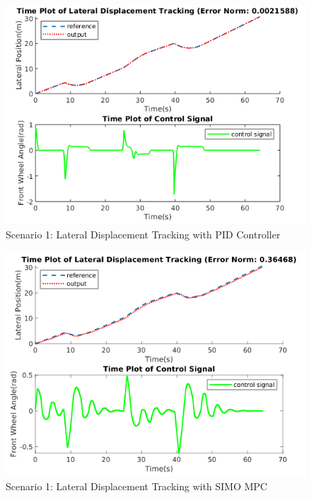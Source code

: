 \documentclass[a4paper, twocolumn]{article}
\begin{document}
\begin{figure}
    \centering
    \includegraphics[scale=0.40]{img/scenario_1/pid-lat_tracking.png}
    \caption{Scenario 1: Lateral Displacement Tracking with PID Controller}
    \label{fig:scen_1_pid_lat}
\end{figure}

\begin{figure}
    \centering
    \includegraphics[scale=0.40]{img/scenario_1/mpc2-lat_tracking.png}
    \caption{Scenario 1: Lateral Displacement Tracking with SIMO MPC}
    \label{fig:scen_1_mpc2_lat}
\end{figure}
\end{document}
